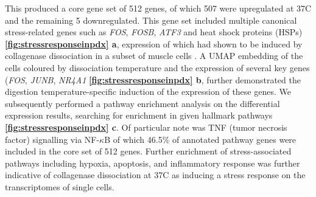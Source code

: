 This produced a core gene set of 512 genes, of which 507 were upregulated at 37\textdegree C and the remaining 5 downregulated. This gene set included multiple canonical stress-related genes such as \textit{FOS}, \textit{FOSB}, \textit{ATF3} and heat shock proteins (HSPs) \textbf{\autoref{fig:stressresponseinpdx} a}, expression of which had shown to be induced by collagenase dissociation in a subset of muscle cells \cite{van2017single}. A \ac{UMAP} embedding of the cells coloured by dissociation temperature and the expression of several key genes (\textit{FOS}, \textit{JUNB}, \textit{NR4A1} \textbf{\autoref{fig:stressresponseinpdx} b}, further demonstrated the digestion temperature-specific induction of the expression of these genes.
We subsequently performed a pathway enrichment analysis on the differential expression results, searching for enrichment in given hallmark pathways \cite{liberzon2015molecular} \textbf{\autoref{fig:stressresponseinpdx} c}. Of particular note was TNF (tumor necrosis factor) signalling via NF-$\kappa$B of which 46.5\% of annotated pathway genes were included in the core set of 512 genes. Further enrichment of stress-associated pathways including hypoxia, apoptosis, and inflammatory response was further indicative of collagenase dissociation at 37\textdegree C as inducing a stress response on the transcriptomes of single cells.


